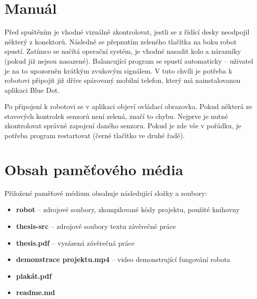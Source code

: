 
%


\chapter{Manuál}
Před spuštěním je vhodné vizuálně zkontrolovat, jestli se z řídící desky neodpojil některý z konektorů. Následně se přepnutím zeleného tlačítka na boku robot spustí. Zatímco se načítá operační systém, je vhodné nasadit kolo a nárazníky (pokud již nejsou nasazené). Balancující program se spustí automaticky -- uživatel je na to upozorněn krátkým zvukovým signálem. V tuto chvíli je potřeba k robotovi připojit již dříve spárovaný mobilní telefon, který má nainstalovanou aplikaci Blue Dot. 

Po připojení k robotovi se v aplikaci objeví ovládací obrazovka. Pokud některá ze stavových kontrolek senzorů není zelená, značí to chybu. Nejprve je nutné zkontrolovat správné zapojení daného senzoru. Pokud je zde vše v pořádku, je potřeba program restartovat (černé tlačítko ve druhé řadě).

\chapter{Obsah paměťového média}
Přiložené paměťové médium obsahuje následující složky a soubory:
\begin{itemize}
  \item \textbf{robot} -- zdrojové soubory, zkompilované kódy projektu, použité knihovny
  \item \textbf{thesis-src} -- zdrojové soubory textu závěrečné práce
  \item \textbf{thesis.pdf} -- vysázená závěrečná práce
  \item \textbf{demonstrace projektu.mp4} -- video demonstrující fungování robota
  \item \textbf{plakát.pdf}
  \item \textbf{readme.md}
\end{itemize}



%
